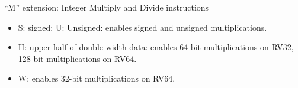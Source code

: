 \documentclass{article}
\begin{document}
\begin{center}
  {\Huge
    ``M'' extension: Integer Multiply and Divide instructions}

  \vspace*{0.5in}


  \vspace{0.2in}

  \begin{minipage}{7in}\large
    \begin{itemize}

      \item S: signed; U: Unsigned:
        enables signed and unsigned multiplications.

      \item H: upper half of double-width data: enables 64-bit
        multiplications on RV32, 128-bit multiplications on RV64.

      \item W: enables 32-bit multiplications on RV64.

    \end{itemize}
  \end{minipage}
\end{center}

\clearpage

\end{document}
